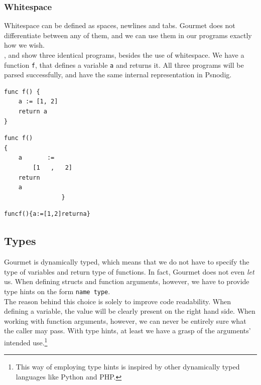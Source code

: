 \subsubsection{Whitespace}

Whitespace can be defined as spaces, newlines and tabs. Gourmet does not differentiate between any of them, and we can use them in our programs exactly how we wish. \\

,  and  show three identical programs, besides the use of whitespace. We have a function \texttt{f}, that defines a variable \texttt{a} and returns it. All three programs will be parsed successfully, and have the same internal representation in Psnodig. \\

\begin{lstlisting}[caption={A Gourmet program with a standard amount of whitespace.}, captionpos=b, label={f with a standard amount of whitespace.}]
func f() {
    a := [1, 2]
    return a
}
\end{lstlisting}

\begin{lstlisting}[caption={A Gourmet program with a lot of whitespace.}, captionpos=b, label={f with a lot of whitespace.}]
func f()
{
    a       :=
        [1   ,   2]
    return
    a
                }
\end{lstlisting}

\begin{lstlisting}[caption={A Gourmet program with no whitespace.}, captionpos=b, label={f with no whitespace.}]
funcf(){a:=[1,2]returna}
\end{lstlisting}

\subsection{Types}

Gourmet is dynamically typed, which means that we do not have to specify the type of variables and return type of functions. In fact, Gourmet does not even \textit{let} us. When defining structs and function arguments, however, we have to provide type hints on the form \texttt{name type}. \\

The reason behind this choice is solely to improve code readability. When defining a variable, the value will be clearly present on the right hand side. When working with function arguments, however, we can never be entirely sure what the caller may pass. With type hints, at least we have a grasp of the arguments' intended use.\footnote{This way of employing type hints is inspired by other dynamically typed languages like Python and PHP.} \\

